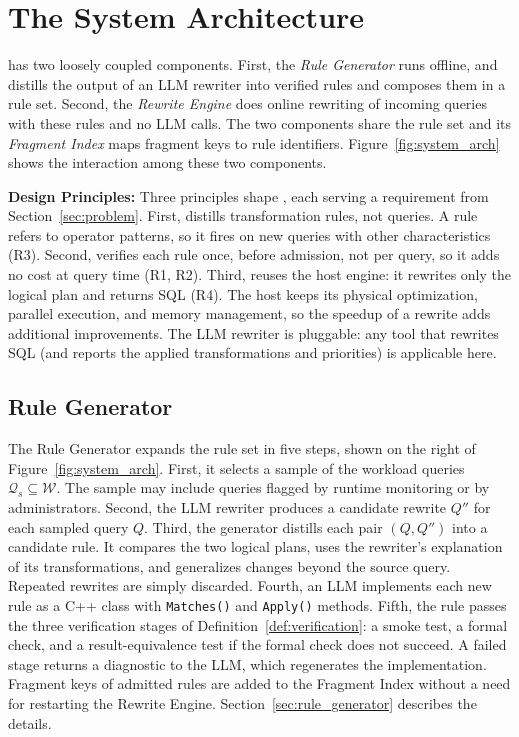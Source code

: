 \section{The {\sys} System Architecture}
\label{sec:architecture}

{\sys} has two loosely coupled components.
First, the \emph{Rule Generator} runs offline, and distills the output of an LLM rewriter into verified rules and composes them in a rule set.
Second, the \emph{Rewrite Engine} does online rewriting of incoming queries with these rules and no LLM calls.
The two components share the rule set and its \emph{Fragment Index} maps fragment keys to rule identifiers.
Figure~\ref{fig:system_arch} shows the interaction among these two components.

\textbf{Design Principles:}
Three principles shape {\sys}, each serving a requirement from Section~\ref{sec:problem}.
First, {\sys} distills transformation rules, not queries. A rule refers to operator patterns, so it fires on new queries with other characteristics (R3).
Second, {\sys} verifies each rule once, before admission, not per query, so it adds no cost at query time (R1, R2).
Third, {\sys} reuses the host engine: it rewrites only the logical plan and returns SQL (R4).
The host keeps its physical optimization, parallel execution, and memory management, so the speedup of a rewrite adds additional improvements.
The LLM rewriter is pluggable: any tool that rewrites SQL (and reports the applied transformations and priorities) is applicable here.\shorten

\subsection{Rule Generator}
\label{sec:arch_generator}
The Rule Generator expands the rule set in five steps, shown on the right of Figure~\ref{fig:system_arch}.
First, it selects a sample of the workload queries $\mathcal{Q}_s \subseteq \mathcal{W}$. The sample may include queries flagged by runtime monitoring or by administrators.
Second, the LLM rewriter produces a candidate rewrite $Q''$ for each sampled query $Q$.
Third, the generator distills each pair $(Q, Q'')$ into a candidate rule.
It compares the two logical plans, uses the rewriter's explanation of its transformations, and generalizes changes beyond the source query. Repeated rewrites are simply discarded.
Fourth, an LLM implements each new rule as a C++ class with \texttt{Matches()} and \texttt{Apply()} methods.
Fifth, the rule passes the three verification stages of Definition~\ref{def:verification}: a smoke test, a formal check, and a result-equivalence test if the formal check does not succeed.
A failed stage returns a diagnostic to the LLM, which regenerates the implementation.
Fragment keys of admitted rules are added to the Fragment Index without a need for restarting the Rewrite Engine.
Section~\ref{sec:rule_generator} describes the details.

